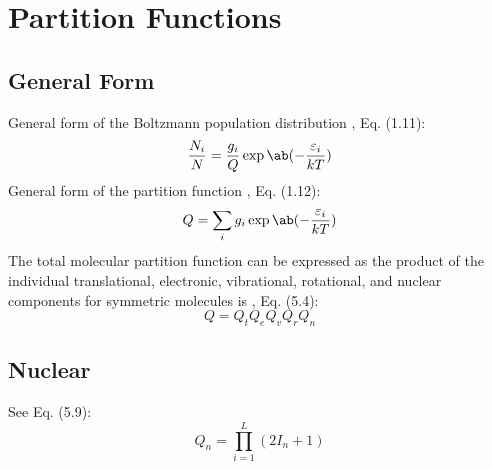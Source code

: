 \documentclass[11pt, twoside, fleqn]{report}
\begin{document}
\section{Partition Functions}

\subsection{General Form}

General form of the Boltzmann population distribution \cite{hansonSpectroscopyOpticalDiagnostics2016}, Eq. (1.11):
\begin{equation*}
    \frac{N_i}{N} = \frac{g_i}{Q}\exp\ab(-\frac{\varepsilon_i}{kT})
\end{equation*}
General form of the partition function \cite{hansonSpectroscopyOpticalDiagnostics2016}, Eq. (1.12):
\begin{equation*}
    Q = \sum_i g_i\exp\ab(-\frac{\varepsilon_i}{kT})
\end{equation*}
The total molecular partition function can be expressed as the product of the individual translational, electronic, vibrational, rotational, and nuclear components for symmetric molecules is \cite{hansonSpectroscopyOpticalDiagnostics2016}, Eq. (5.4):
\begin{equation*}
    Q = Q_tQ_eQ_vQ_rQ_n
\end{equation*}

\subsection{Nuclear}

See \cite{hansonSpectroscopyOpticalDiagnostics2016} Eq. (5.9):
\begin{equation*}
    Q_n = \prod_{i = 1}^L (2I_n + 1)
\end{equation*}
\end{document}
